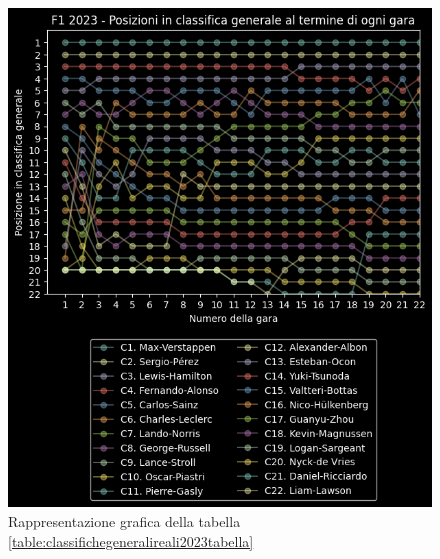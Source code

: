\documentclass[12pt,a4paper,openright,twoside]{book}
\begin{document}
\begin{figure}[H]
    \centering
     \includegraphics[scale=1.0]{figures/realstandings2023.png}
     \caption{Rappresentazione grafica della tabella \ref{table:classifichegeneralireali2023tabella} }
     \label{fig:classifichegeneralireali2023figura}
 \end{figure}
\end{document}
